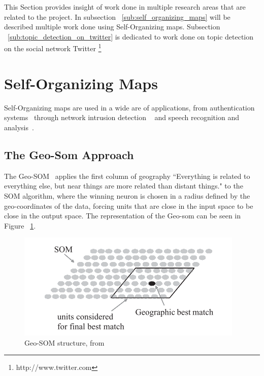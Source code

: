 
This Section provides insight of work done in multiple research areas that are related to the project. In subsection ~\ref{sub:self_organizing_maps} will be described multiple work done using Self-Organizing maps. Subsection ~\ref{sub:topic_detection_on_twitter} is dedicated to work done on topic detection on the social network Twitter \footnote{http://www.twitter.com}

\section{Self-Organizing Maps} 
\label{sec:self_organizing_maps}
Self-Organizing maps are used in a wide are of applications, from authentication systems~\cite{Dozono2012} through network intrusion detection ~\cite{intrusion_som} and speech recognition and analysis~\cite{phonetic_typewiter}.

\subsection{The Geo-Som Approach} 
\label{sub:types_of_soms}
The Geo-SOM~\citet{Bacao2005} applies the first column of geography “Everything is related to everything else, but near things are more related than distant things." to the SOM algorithm, where the winning neuron is chosen in a radius defined by the geo-coordinates of the data, forcing units that are close in the input space to be close in the output space. The representation of the Geo-som can be seen in Figure ~\ref{fig:geo_som}.

\begin{figure}[tb]
  \begin{center}
    \includegraphics[]{images/6_geo-som.png}
  \end{center}
  \caption{Geo-SOM structure, from~\citet{Bacao2005}}
  \label{fig:geo_som}
\end{figure}

